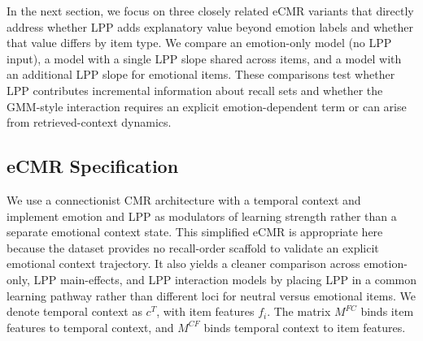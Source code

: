 \documentclass[
  letterpaper,
  DIV=11,
  numbers=noendperiod]{scrartcl}
\begin{document}
In the next section, we focus on three closely related eCMR variants
that directly address whether LPP adds explanatory value beyond emotion
labels and whether that value differs by item type. We compare an
emotion-only model (no LPP input), a model with a single LPP slope
shared across items, and a model with an additional LPP slope for
emotional items. These comparisons test whether LPP contributes
incremental information about recall sets and whether the GMM-style
interaction requires an explicit emotion-dependent term or can arise
from retrieved-context dynamics.

\subsection{eCMR Specification}\label{ecmr-specification}

We use a connectionist CMR architecture with a temporal context and
implement emotion and LPP as modulators of learning strength rather than
a separate emotional context state. This simplified eCMR is appropriate
here because the dataset provides no recall-order scaffold to validate
an explicit emotional context trajectory. It also yields a cleaner
comparison across emotion-only, LPP main-effects, and LPP interaction
models by placing LPP in a common learning pathway rather than different
loci for neutral versus emotional items. We denote temporal context as
\(c^T\), with item features \(f_i\). The matrix \(M^{FC}\) binds item
features to temporal context, and \(M^{CF}\) binds temporal context to
item features.
\end{document}
